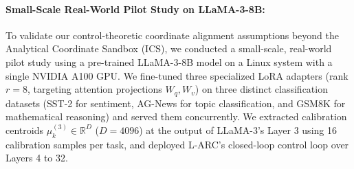 \paragraph{Small-Scale Real-World Pilot Study on LLaMA-3-8B:}
To validate our control-theoretic coordinate alignment assumptions beyond the Analytical Coordinate Sandbox (ICS), we conducted a small-scale, real-world pilot study using a pre-trained LLaMA-3-8B model on a Linux system with a single NVIDIA A100 GPU. We fine-tuned three specialized LoRA adapters (rank $r = 8$, targeting attention projections $W_q, W_v$) on three distinct classification datasets (SST-2 for sentiment, AG-News for topic classification, and GSM8K for mathematical reasoning) and served them concurrently. We extracted calibration centroids $\mu_k^{(3)} \in \mathbb{R}^{D}$ ($D = 4096$) at the output of LLaMA-3's Layer 3 using 16 calibration samples per task, and deployed L-ARC's closed-loop control loop over Layers 4 to 32. 

